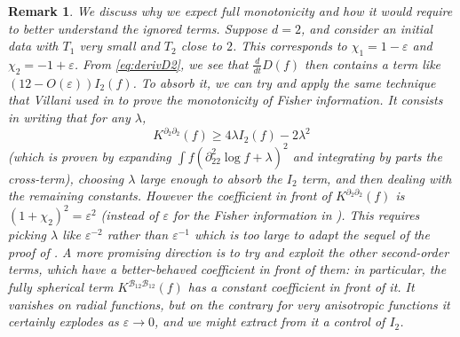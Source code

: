 \documentclass[11pt,a4paper]{article}
\theoremstyle{definition}
\theoremstyle{plain}
\newtheorem{remark}[defi]{Remark}
\begin{document}
\begin{remark}
    \label{rem:fullmono}
    We discuss why we expect full monotonicity and how it would require to better understand the ignored terms. Suppose $d=2$, and consider an initial data with $T_1$ very small and $T_2$ close to $2$. This corresponds to $\chi_1 = 1-\varepsilon$ and $\chi_2= -1+\varepsilon$. From \eqref{eq:derivD2}, we see that $\frac{d}{dt}D(f)$ then contains a term like $(12-O(\varepsilon)) I_2(f)$. To absorb it, we can try and apply the same technique that Villani used in \cite{Villani2000} to prove the monotonicity of Fisher information. It consists in writing that for any $\lambda$,
    $$K^{\partial_2 \partial_2}(f) \geq 4\lambda I_2(f) -2\lambda^2$$
    (which is proven by expanding $\int f (\partial^2_{22}\log f + \lambda)^2$ and integrating by parts the cross-term), choosing $\lambda$ large enough to absorb the $I_2$ term, and then dealing with the remaining constants. However the coefficient in front of $K^{\partial_2 \partial_2}(f)$ is $(1+\chi_2)^2= \varepsilon^2$ (instead of $\varepsilon$ for the Fisher information in \cite{Villani2000}). This requires picking $\lambda$ like $\varepsilon^{-2}$ rather than $\varepsilon^{-1}$ which is too large to adapt the sequel of the proof of \cite{Villani2000}. A more promising direction is to try and exploit the other second-order terms, which have a better-behaved coefficient in front of them: in particular, the fully spherical term $K^{ \mathcal{B}_{12}\mathcal{B}_{12}}(f)$ has a constant coefficient in front of it. It vanishes on radial functions, but on the contrary for very anisotropic functions it certainly explodes as $\varepsilon\rightarrow 0$, and we might extract from it a control of $I_2$.
\end{remark}
\sloppy
\printbibliography
\end{document}
